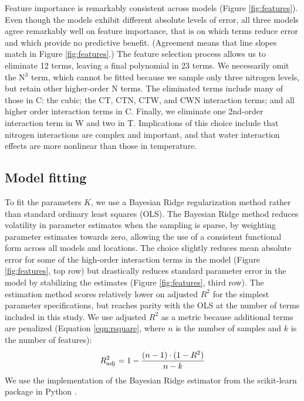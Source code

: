 \documentclass[gmd, manuscript]{copernicus} %
\begin{document}
Feature importance is remarkably consistent across models (Figure \ref{fig:features}). 
Even though the models exhibit different absolute levels of error, all three models agree remarkably well on feature importance, that is on  which terms reduce error and which provide no predictive benefit. (Agreement means that line slopes match in Figure \ref{fig:features}.) 
The feature selection process allows us to eliminate 12 terms, leaving a final polynomial in 23 terms.
We necessarily omit the N$^3$ term, which cannot be fitted because we sample only three nitrogen levels, but retain other higher-order N terms. 
The eliminated terms include many of those in C: the cubic; the CT, CTN, CTW, and CWN interaction terms; and all higher order interaction terms in C. 
Finally, we eliminate one 2nd-order interaction term in W and two in T. 
Implications of this choice include that nitrogen interactions are complex and important, and that water interaction effects are more nonlinear than those in temperature.  

\subsection{Model fitting}
To fit the parameters $K$, we use a Bayesian Ridge regularization method \citep{MacKay91} rather than standard ordinary least squares (OLS). 
The Bayesian Ridge method reduces volatility in parameter estimates when the sampling is sparse, by weighting parameter estimates towards zero, allowing the use of a consistent functional form across all models and locations. 
The choice slightly reduces mean absolute error for some of the high-order interaction terms in the model (Figure \ref{fig:features}, top row) but drastically reduces standard parameter error in the model by stabilizing the estimates (Figure \ref{fig:features}, third row).
The estimation method scores relatively lower on adjusted $R^2$ for the simplest parameter specifications, but reaches parity with the OLS at the number of terms included in this study. We use adjusted $R^2$ as a metric because additional terms are penalized (Equation \ref{eqn:rsquare}, where $n$ is the number of samples and $k$ is the number of features): 
\begin{equation}
	\centering
    \label{eqn:rsquare}
    R^{2}_{adj} = 1 - \frac{(n-1) \cdot (1 - R^{2})}{n - k}
\end{equation}
We use the implementation of the Bayesian Ridge estimator from the scikit-learn package in Python \citep{scikit-learn}. 
\end{document}
